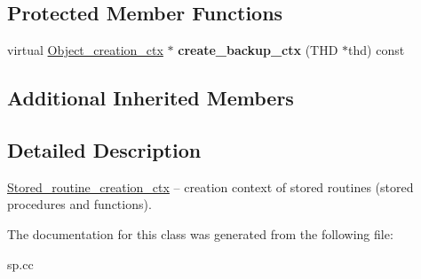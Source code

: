 \subsection*{Protected Member Functions}
\begin{DoxyCompactItemize}
\item 
\mbox{\label{classStored__routine__creation__ctx_a89a1266bba103a0a81bcbec287c50015}} 
virtual \mbox{\hyperlink{classObject__creation__ctx}{Object\+\_\+creation\+\_\+ctx}} $\ast$ {\bfseries create\+\_\+backup\+\_\+ctx} (T\+HD $\ast$thd) const
\end{DoxyCompactItemize}
\subsection*{Additional Inherited Members}


\subsection{Detailed Description}
\mbox{\hyperlink{classStored__routine__creation__ctx}{Stored\+\_\+routine\+\_\+creation\+\_\+ctx}} -- creation context of stored routines (stored procedures and functions). 

The documentation for this class was generated from the following file\+:\begin{DoxyCompactItemize}
\item 
sp.\+cc\end{DoxyCompactItemize}
